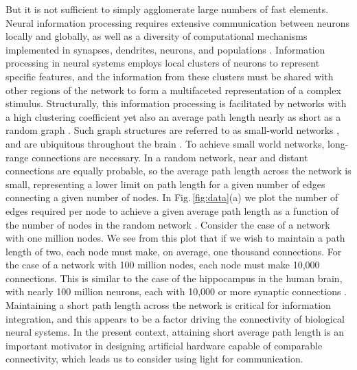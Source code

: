 \documentclass[twocolumn]{article}
\begin{document}
But it is not sufficient to simply agglomerate large numbers of fast elements. Neural information processing requires extensive communication between neurons locally and globally, as well as a diversity of computational mechanisms implemented in synapses, dendrites, neurons, and populations \cite{daab2001,geki2002,bu2006}. Information processing in neural systems employs local clusters of neurons to represent specific features, and the information from these clusters must be shared with other regions of the network to form a multifaceted representation of a complex stimulus. Structurally, this information processing is facilitated by networks with a high clustering coefficient yet also an average path length nearly as short as a random graph \cite{eskn2015}. Such graph structures are referred to as small-world networks \cite{wast1998}, and are ubiquitous throughout the brain \cite{sp2010}. To achieve small world networks, long-range connections are necessary. In a random network, near and distant connections are equally probable, so the average path length across the network is small, representing a lower limit on path length for a given number of edges connecting a given number of nodes. In Fig.\,\ref{fig:data}(a) we plot the number of edges required per node to achieve a given average path length as a function of the number of nodes in the random network \cite{frfr2004}. Consider the case of a network with one million nodes. We see from this plot that if we wish to maintain a path length of two, each node must make, on average, one thousand connections. For the case of a network with 100 million nodes, each node must make 10,000 connections. This is similar to the case of the hippocampus in the human brain, with nearly 100 million neurons, each with 10,000 or more synaptic connections \cite{bu2006}. Maintaining a short path length across the network is critical for information integration, and this appears to be a factor driving the connectivity of biological neural systems. In the present context, attaining short average path length is an important motivator in designing artificial hardware capable of comparable connectivity, which leads us to consider using light for communication.
\end{document}
